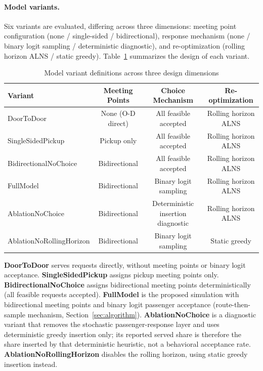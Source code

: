 \paragraph{Model variants.}
Six variants are evaluated, differing across three dimensions: meeting point
configuration (none / single-sided / bidirectional), response mechanism (none /
binary logit sampling / deterministic diagnostic), and re-optimization (rolling horizon ALNS / static
greedy). Table~\ref{tab:variants} summarizes the design of each variant.

\begin{table}[h]
\centering
\caption{Model variant definitions across three design dimensions}
\label{tab:variants}
\begin{tabular}{lccc}
\toprule
Variant & Meeting Points & Choice Mechanism & Re-optimization \\
\midrule
DoorToDoor               & None (O-D direct) & All feasible accepted & Rolling horizon ALNS \\
SingleSidedPickup        & Pickup only        & All feasible accepted & Rolling horizon ALNS \\
BidirectionalNoChoice    & Bidirectional      & All feasible accepted & Rolling horizon ALNS \\
FullModel                & Bidirectional      & Binary logit sampling & Rolling horizon ALNS \\
AblationNoChoice         & Bidirectional      & Deterministic insertion diagnostic & Rolling horizon ALNS \\
AblationNoRollingHorizon & Bidirectional      & Binary logit sampling & Static greedy \\
\bottomrule
\end{tabular}
\end{table}

\textbf{DoorToDoor} serves requests directly, without meeting points or binary
logit acceptance. \textbf{SingleSidedPickup} assigns pickup meeting points only.
\textbf{BidirectionalNoChoice} assigns bidirectional meeting points deterministically
(all feasible requests accepted). \textbf{FullModel} is the proposed simulation with
bidirectional meeting points and binary logit passenger acceptance (route-then-sample
mechanism, Section~\ref{sec:algorithm}).
\textbf{AblationNoChoice} is a diagnostic variant that removes the stochastic
passenger-response layer and uses deterministic greedy insertion only; its reported
served share is therefore the share inserted by that deterministic heuristic, not a
behavioral acceptance rate. \textbf{AblationNoRollingHorizon} disables the rolling
horizon, using static greedy insertion instead.

